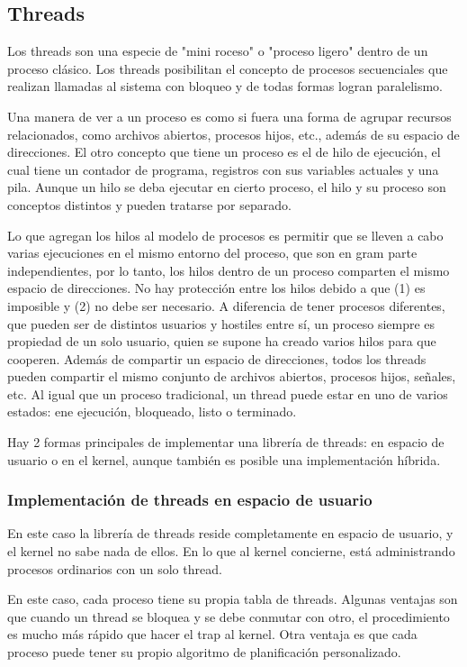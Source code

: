 \subsection{Threads}

Los threads son una especie de "mini roceso" o "proceso ligero" dentro de un proceso clásico. Los threads posibilitan el concepto de procesos secuenciales que realizan llamadas al sistema con bloqueo y de todas formas logran paralelismo.

Una manera de ver a un proceso es como si fuera una forma de agrupar recursos relacionados, como archivos abiertos, procesos hijos, etc., además de su espacio de direcciones. El otro concepto que tiene un proceso es el de hilo de ejecución, el cual tiene un contador de programa, registros con sus variables actuales y una pila. Aunque un hilo se deba ejecutar en cierto proceso, el hilo y su proceso son conceptos distintos y pueden tratarse por separado.

Lo que agregan los hilos al modelo de procesos es permitir que se lleven a cabo varias ejecuciones en el mismo entorno del proceso, que son en gram parte independientes, por lo tanto, los hilos dentro de un proceso comparten el mismo espacio de direcciones. No hay protección entre los hilos debido a que (1) es imposible y (2) no debe ser necesario. A diferencia de tener procesos diferentes, que pueden ser de distintos usuarios y hostiles entre sí, un proceso siempre es propiedad de un solo usuario, quien se supone ha creado varios hilos para que cooperen. Además de compartir un espacio de direcciones, todos los threads pueden compartir el mismo conjunto de archivos abiertos, procesos hijos, señales, etc. Al igual que un proceso tradicional, un thread puede estar en uno de varios estados: ene ejecución, bloqueado, listo o terminado.

Hay 2 formas principales de implementar una librería de threads: en espacio de usuario o en el kernel, aunque también es posible una implementación híbrida.

\subsubsection{Implementación de threads en espacio de usuario}

En este caso la librería de threads reside completamente en espacio de usuario, y el kernel no sabe nada de ellos. En lo que al kernel concierne, está administrando procesos ordinarios con un solo thread.

En este caso, cada proceso tiene su propia tabla de threads. Algunas ventajas son que cuando un thread se bloquea y se debe conmutar con otro, el procedimiento es mucho más rápido que hacer el trap al kernel. Otra ventaja es que cada proceso puede tener su propio algoritmo de planificación personalizado.

